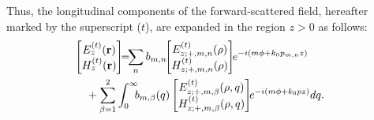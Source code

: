 \documentclass[conference,a4paper]{IEEEtran}
\begin{document}
Thus, the longitudinal components of the forward-scattered field, hereafter marked by the superscript ($t$), are expanded in the region $z>0$ as follows:
\begin{align}\label{eq23}
&\hspace{-4mm}\left[\!\!\!
\begin{array}{c}
{E_z^{(t)}}({\bf r})\\
{H_z^{(t)}}({\bf r})
\end{array}\!\!\!\right]\!\!{=}\!\!\sum\limits_{n} b_{m,n}\!\!\left[\!\!\!
\begin{array}{c}
{E}_{z;+,m,n}^{(t)}(\rho)\\
{H}_{z;+,m,n}^{(t)}(\rho)
\end{array}\!\!\!\right]\!\!e^{-i(m\f + k_0 p_{m,n}z)}\notag\\
&+ \sum\limits_{\beta=1}^{2}\int_{0}^{\infty}\!\!\!b_{m,\beta}(q)\left[\!\!\!
\begin{array}{c}
{E}_{z;+,m,\beta}^{(t)}(\rho,q)\\
{H}_{z;+,m,\beta}^{(t)}(\rho,q)
\end{array}\!\!\!\right]\!\!e^{-i(m\f + k_0 p z)}{d}q.
\end{align}
\end{document}
